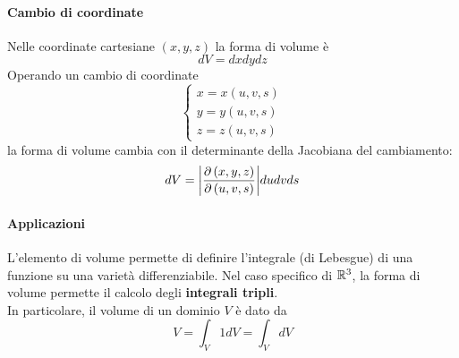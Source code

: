 \paragraph{Cambio di coordinate}
Nelle coordinate cartesiane $\left(x,y,z\right)$ la forma di volume è
\begin{equation*}
	dV=dxdydz
\end{equation*}
Operando un cambio di coordinate
\begin{equation*}
	\begin{cases}
		x=x(u,v,s)\\
		y=y(u,v,s)\\
		z=z(u,v,s)
	\end{cases}
\end{equation*}
la forma di volume cambia con il determinante della Jacobiana del cambiamento:
\begin{equation*}
	dV=\abs{\pdv{\left(x,y,z\right)}{\left(u,v,s\right)}}dudvds
\end{equation*}
\paragraph{Applicazioni}
L'elemento di volume permette di definire l'integrale (di Lebesgue) di una funzione su una varietà differenziabile. Nel caso specifico di $\mathbb{R}^3$, la forma di volume permette il calcolo degli \textbf{integrali tripli}.\\
In particolare, il volume di un dominio $V$ è dato da
\begin{equation*}
	V=\int_{V}1dV=\int_VdV
\end{equation*}
